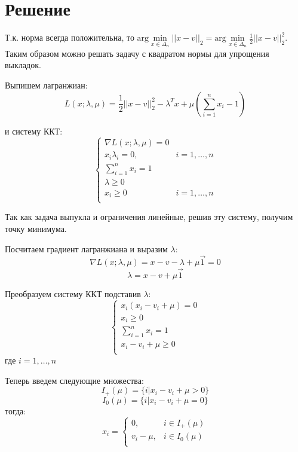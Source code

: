 \documentclass[12pt, a4paper]{article}
\begin{document}
    \section{Решение}

    Т.к. норма всегда положительна, то $\text{arg}\min\limits_{x \in \Delta_n}||x - v||_2 = \text{arg}\min\limits_{x \in \Delta_n}\frac{1}{2}||x - v||_2^2$.
    Таким образом можно решать задачу с квадратом нормы для упрощения выкладок.

    Выпишем лагранжиан:
    $$L(x; \lambda, \mu) = \dfrac{1}{2} ||x - v||_2^2 - \lambda^Tx + \mu(\displaystyle\sum_{i=1}^n x_i - 1)$$

    и систему ККТ:
    $$
    \begin{cases}
        \nabla L(x; \lambda, \mu) = 0\\
        x_i \lambda_i = 0, & i = 1, \dots, n\\
        \displaystyle\sum_{i=1}^n x_i = 1 \\
        \lambda \geq 0 \\
        x_i \geq 0 & i = 1, \dots, n\\
    \end{cases}
    $$

    Так как задача выпукла и ограничения линейные, решив эту систему, получим точку минимума.

    Посчитаем градиент лагранжиана и выразим $\lambda$:
    $$\nabla L(x; \lambda, \mu) = x - v - \lambda + \mu\vec{1} = 0$$
    $$\lambda = x - v + \mu\vec{1}$$

    Преобразуем систему ККТ подставив $\lambda$:
    $$
    \begin{cases}
        x_i(x_i - v_i + \mu) = 0\\
        x_i \geq 0\\
        \displaystyle\sum_{i=1}^n x_i = 1 \\
        x_i - v_i + \mu \geq 0\\
    \end{cases}
    $$
    где $i = 1, \dots, n$

    Теперь введем следующие множества:
    $$I_+(\mu) = \{i | x_i - v_i + \mu > 0\}$$
    $$I_0(\mu) = \{i | x_i - v_i + \mu = 0\}$$
    тогда:
    \[x_i =
    \begin{cases}
        0, & i \in I_+(\mu) \\
        v_i - \mu, & i \in I_0(\mu)\\
    \end{cases} \label{eq:x} \tag{*}
    \]
\end{document}
